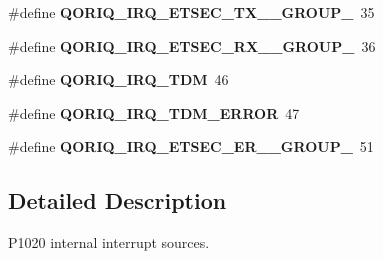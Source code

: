 \begin{DoxyCompactItemize}
\item 
\mbox{\label{group__QoriqInterruptP1020_ga2374457252bd4730ca19c7fc30fee2cf}} 
\#define {\bfseries Q\+O\+R\+I\+Q\+\_\+\+I\+R\+Q\+\_\+\+E\+T\+S\+E\+C\+\_\+\+T\+X\+\_\+\_\+\+G\+R\+O\+U\+P\+\_}~35
\item 
\mbox{\label{group__QoriqInterruptP1020_ga8802d426e51eeff52f3e1339e1265289}} 
\#define {\bfseries Q\+O\+R\+I\+Q\+\_\+\+I\+R\+Q\+\_\+\+E\+T\+S\+E\+C\+\_\+\+R\+X\+\_\+\_\+\+G\+R\+O\+U\+P\+\_}~36
\item 
\mbox{\label{group__QoriqInterruptP1020_ga7584bb4ea83aad7aa27bf75639190e47}} 
\#define {\bfseries Q\+O\+R\+I\+Q\+\_\+\+I\+R\+Q\+\_\+\+T\+DM}~46
\item 
\mbox{\label{group__QoriqInterruptP1020_ga133e9acbc1287e233400f6627658e6b6}} 
\#define {\bfseries Q\+O\+R\+I\+Q\+\_\+\+I\+R\+Q\+\_\+\+T\+D\+M\+\_\+\+E\+R\+R\+OR}~47
\item 
\mbox{\label{group__QoriqInterruptP1020_gad60f03b0f6b1b4e52dd0af027230681a}} 
\#define {\bfseries Q\+O\+R\+I\+Q\+\_\+\+I\+R\+Q\+\_\+\+E\+T\+S\+E\+C\+\_\+\+E\+R\+\_\+\_\+\+G\+R\+O\+U\+P\+\_}~51
\end{DoxyCompactItemize}


\subsection{Detailed Description}
P1020 internal interrupt sources. 

